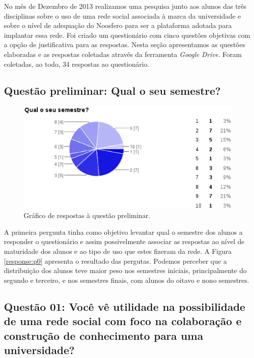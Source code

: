No mês de Dezembro de 2013 realizamos uma pesquisa junto aos alunos das três
disciplinas sobre o uso de uma rede social associada à marca da universidade
e sobre o nível de adequação do Noosfero para ser a plataforma adotada para
implantar essa rede.
%
Foi criado um questionário com cinco questões objetivas com a opção de
justificativa para as respostas.
%
Nesta seção apresentamos as questões elaboradas e as respostas coletadas
através da ferramenta \textit{Google Drive}. Foram coletadas, ao todo,
34 respostas ao questionário.

\subsection*{Questão preliminar: Qual o seu semestre?}

\begin{figure}[h!]
    \centering
    \includegraphics[keepaspectratio=true,scale=0.6]
      {figuras/p0.eps}
    \caption{Gráfico de respostas à questão preliminar.}
    \label{response:0}
\end{figure}

A primeira pergunta tinha como objetivo levantar qual o semestre dos alunos
a responder o questionário e assim possivelmente associar as respostas
ao nível de maturidade dos alunos e ao tipo de uso que estes fizeram da rede.
%
A Figura \ref{response:p0} apresenta o resultado das pergutas. Podemos perceber
que a distribuição dos alunos teve maior peso nos semestres iniciais,
principalmente do segundo e terceiro, e nos semestres finais, com alunos
do oitavo e nono semestres.

\subsection*{Questão 01: Você vê utilidade na possibilidade de uma rede social
com foco na colaboração e construção de conhecimento para uma universidade?}

